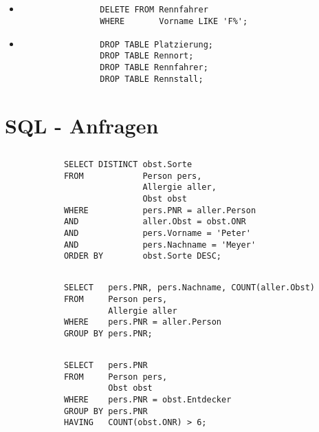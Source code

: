 \documentclass[ngerman]{gdb-aufgabenblatt}
\begin{document}
	\subsection{} %
		
		\begin{itemize}
			\item \begin{verbatim}
			    DELETE FROM Rennfahrer
			    WHERE       Vorname LIKE 'F%';
			\end{verbatim}	
			\item \begin{verbatim}
			    DROP TABLE Platzierung;
			    DROP TABLE Rennort;
			    DROP TABLE Rennfahrer;
			    DROP TABLE Rennstall;
			\end{verbatim}
		\end{itemize}

\section{SQL - Anfragen}
	\subsection{} %
		\begin{verbatim}
		    SELECT DISTINCT obst.Sorte
		    FROM            Person pers,
		                    Allergie aller,
		                    Obst obst
		    WHERE           pers.PNR = aller.Person
		    AND             aller.Obst = obst.ONR
		    AND             pers.Vorname = 'Peter'
		    AND             pers.Nachname = 'Meyer'
		    ORDER BY        obst.Sorte DESC;
		\end{verbatim}
	\subsection{} %
		\begin{verbatim}
		    SELECT   pers.PNR, pers.Nachname, COUNT(aller.Obst)
		    FROM     Person pers,
		             Allergie aller
		    WHERE    pers.PNR = aller.Person
		    GROUP BY pers.PNR;
		\end{verbatim}
	\subsection{} %
		\begin{verbatim}
		    SELECT   pers.PNR
		    FROM     Person pers,
		             Obst obst
		    WHERE    pers.PNR = obst.Entdecker
		    GROUP BY pers.PNR
		    HAVING   COUNT(obst.ONR) > 6;
		\end{verbatim}
\end{document}
